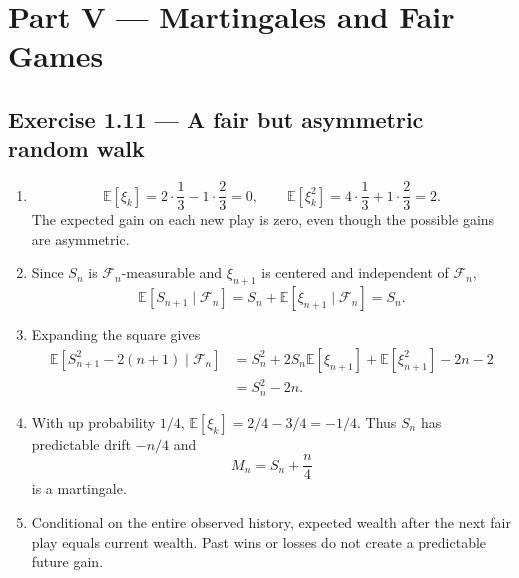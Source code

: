 \documentclass[11pt]{article}
\newcommand{\E}{\mathbb{E}}
\newcommand{\1}{\mathbf{1}}
\begin{document}
\section*{Part V --- Martingales and Fair Games}

\subsection*{Exercise 1.11 --- A fair but asymmetric random walk}
\begin{enumerate}
  \item
  \[
  \E[\xi_k]=2\cdot\frac13-1\cdot\frac23=0,
  \qquad
  \E[\xi_k^2]=4\cdot\frac13+1\cdot\frac23=2.
  \]
  The expected gain on each new play is zero, even though the possible gains
  are asymmetric.
  \item Since $S_n$ is $\mathcal F_n$-measurable and $\xi_{n+1}$ is centered
  and independent of $\mathcal F_n$,
  \[
  \E[S_{n+1}\mid\mathcal F_n]
  =S_n+\E[\xi_{n+1}\mid\mathcal F_n]=S_n.
  \]
  \item Expanding the square gives
  \begin{align*}
  \E[S_{n+1}^2-2(n+1)\mid\mathcal F_n]
  &=S_n^2+2S_n\E[\xi_{n+1}]+\E[\xi_{n+1}^2]-2n-2\\
  &=S_n^2-2n.
  \end{align*}
  \item With up probability $1/4$,
  $\E[\xi_k]=2/4-3/4=-1/4$. Thus $S_n$ has predictable drift $-n/4$ and
  \[
  M_n=S_n+\frac n4
  \]
  is a martingale.
  \item Conditional on the entire observed history, expected wealth after the
  next fair play equals current wealth. Past wins or losses do not create a
  predictable future gain.
\end{enumerate}
\end{document}
